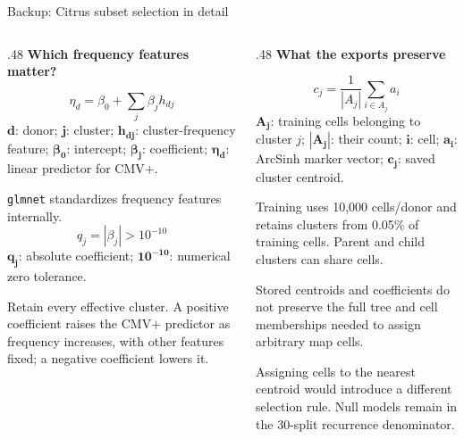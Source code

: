 \documentclass[aspectratio=169,10pt]{beamer}
\newcommand{\eyebrow}[1]{{\color{Teal}\bfseries #1}\par\smallskip}
\newcommand{\compactmath}{%
  \setlength{\abovedisplayskip}{4pt}\setlength{\belowdisplayskip}{4pt}%
  \setlength{\abovedisplayshortskip}{2pt}\setlength{\belowdisplayshortskip}{4pt}}
\begin{document}
\begin{frame}{Backup: Citrus subset selection in detail}
  \small\compactmath
  \begin{columns}[T,onlytextwidth]
    \begin{column}{.48\textwidth}
      \eyebrow{Which frequency features matter?}
      \[\eta_d=\beta_0+\sum_j\beta_j h_{dj}\]
      {\scriptsize $\boldsymbol{d}$: donor; $\boldsymbol{j}$: cluster; $\boldsymbol{h_{dj}}$: cluster-frequency feature; $\boldsymbol{\beta_0}$: intercept; $\boldsymbol{\beta_j}$: coefficient; $\boldsymbol{\eta_d}$: linear predictor for CMV$+$.}\par\smallskip
      \small\compactmath \texttt{glmnet} standardizes frequency features internally.
      \[q_j=|\beta_j|>10^{-10}\]
      {\scriptsize $\boldsymbol{q_j}$: absolute coefficient; $\boldsymbol{10^{-10}}$: numerical zero tolerance.}\par\smallskip
      \small Retain every effective cluster. A positive coefficient raises the CMV$+$ predictor as frequency increases, with other features fixed; a negative coefficient lowers it.
    \end{column}
    \begin{column}{.48\textwidth}
      \eyebrow{What the exports preserve}
      \[c_j=\frac{1}{|A_j|}\sum_{i\in A_j}a_i\]
      {\scriptsize $\boldsymbol{A_j}$: training cells belonging to cluster $j$; $\boldsymbol{|A_j|}$: their count; $\boldsymbol{i}$: cell; $\boldsymbol{a_i}$: ArcSinh marker vector; $\boldsymbol{c_j}$: saved cluster centroid.}\par\medskip
      \small Training uses 10,000 cells/donor and retains clusters from 0.05\% of training cells. Parent and child clusters can share cells.\par\medskip
      Stored centroids and coefficients do not preserve the full tree and cell memberships needed to assign arbitrary map cells.\par\smallskip
      {\scriptsize Assigning cells to the nearest centroid would introduce a different selection rule. Null models remain in the 30-split recurrence denominator.}
    \end{column}
  \end{columns}
\end{frame}
\end{document}
